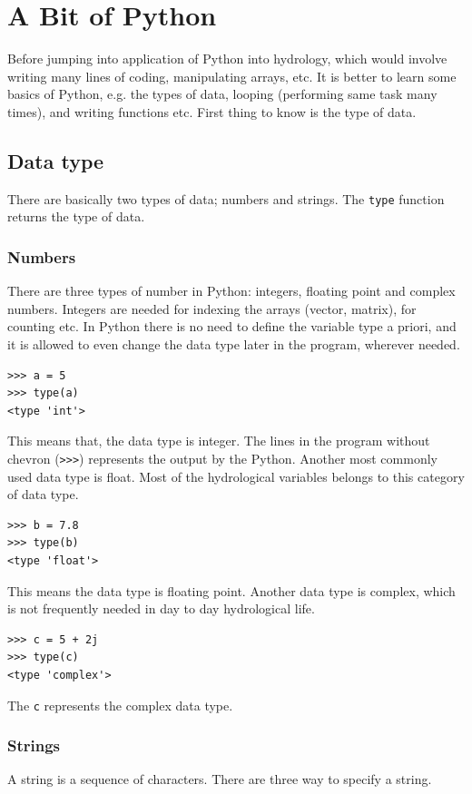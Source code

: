 \documentclass[10pt]{book}
\begin{document}
{\chapter{A Bit of Python}
Before jumping into application of Python into hydrology, which would involve writing many lines of coding, manipulating arrays, etc. It is better to learn some basics of Python, e.g. the types of data, looping (performing same task many times), and writing functions etc. First thing to know is the type of data. 

\section{Data type}
There are basically two types of data; numbers and strings. The \verb"type" function returns the type of data.

\subsection{Numbers}
There are three types of number in Python: integers, floating point and complex numbers. Integers are needed for indexing the arrays (vector, matrix), for counting etc. In Python there is no need to define the variable type a priori, and it is allowed to even change the data type later in the program, wherever needed. 
\beforeverb \begin{verbatim}
>>> a = 5
>>> type(a)
<type 'int'>
\end{verbatim} \afterverb

This means that, the data type is integer. The lines in the program without chevron (\verb">>>") represents the output by the Python. Another most commonly used data type is float. Most of the hydrological variables belongs to this category of data type. 
\beforeverb
\begin{verbatim}
>>> b = 7.8
>>> type(b)
<type 'float'>
\end{verbatim}
\afterverb
This means the data type is floating point. Another data type is complex, which is not frequently needed in day to day hydrological life. 
\beforeverb
\begin{verbatim}
>>> c = 5 + 2j
>>> type(c)
<type 'complex'>
\end{verbatim}
\afterverb
The {\tt c} represents the complex data type.

\subsection{Strings}
A string is a sequence of characters. There are three way to specify a string.

}
\end{document}
